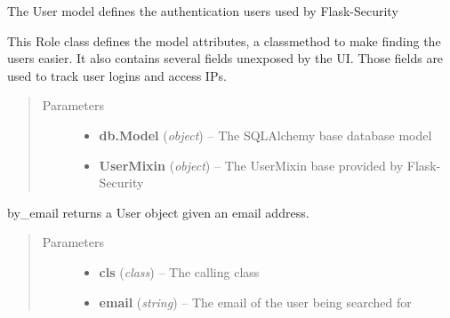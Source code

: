 \documentclass[letterpaper,10pt,english]{sphinxmanual}
\begin{document}
\begin{fulllineitems}
\label{dev-patients:cagenix.patients.models.Patient}
The User model defines the authentication users used by Flask-Security

This Role class defines the model attributes, a classmethod to make finding
the users easier. It also contains several fields unexposed by the UI. Those
fields are used to track user logins and access IPs.
\begin{quote}\begin{description}
\item[{Parameters}] \leavevmode\begin{itemize}
\item {} 
\textbf{db.Model} (\emph{object}) -- The SQLAlchemy base database model

\item {} 
\textbf{UserMixin} (\emph{object}) -- The UserMixin base provided by Flask-Security

\end{itemize}

\end{description}\end{quote}

\begin{fulllineitems}
\label{dev-patients:cagenix.patients.models.Patient.by_email}
by\_email returns a User object given an email address.
\begin{quote}\begin{description}
\item[{Parameters}] \leavevmode\begin{itemize}
\item {} 
\textbf{cls} (\emph{class}) -- The calling class

\item {} 
\textbf{email} (\emph{string}) -- The email of the user being searched for

\end{itemize}

\end{description}\end{quote}

\end{fulllineitems}


\end{fulllineitems}
\end{document}
